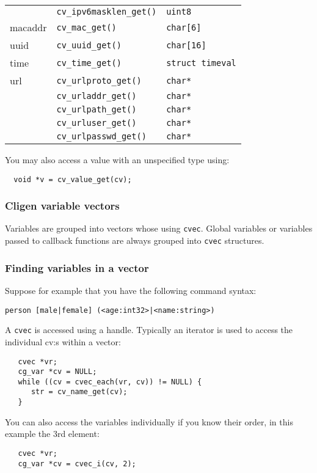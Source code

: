 \documentclass[a4paper, 10pt] {article}
\begin{document}
\begin{tabular}{ | l | l | l | }
           & {\tt cv\_ipv6masklen\_get()} & {\tt uint8}\\
macaddr    & {\tt cv\_mac\_get()} & {\tt char[6]}\\
uuid       & {\tt cv\_uuid\_get()} & {\tt char[16]}\\
time       & {\tt cv\_time\_get()} & {\tt struct timeval}\\
url        & {\tt cv\_urlproto\_get()} & {\tt char*}\\
           & {\tt cv\_urladdr\_get()} & {\tt char*}\\
           & {\tt cv\_urlpath\_get()} & {\tt char*}\\
           & {\tt cv\_urluser\_get()} & {\tt char*}\\
           & {\tt cv\_urlpasswd\_get()} & {\tt char*}\\
\hline
\end{tabular}

You may also access a value with an unspecified type using:
\begin{verbatim}
  void *v = cv_value_get(cv);
\end{verbatim}


\subsubsection{Cligen variable vectors}
Variables are grouped into vectors whose using {\tt cvec}. Global variables or variables
passed to callback functions are always grouped into {\tt cvec}
structures.

\subsubsection{Finding variables in a vector}
\label{sec:find}

Suppose for example that you have the following command syntax:
\begin{verbatim}
person [male|female] (<age:int32>|<name:string>)
\end{verbatim}

A {\tt cvec} is accessed using a handle. Typically an iterator is used to access the individual cv:s within a vector:
\begin{verbatim}
   cvec *vr;
   cg_var *cv = NULL;
   while ((cv = cvec_each(vr, cv)) != NULL) {
      str = cv_name_get(cv);
   }
\end{verbatim}

You can also access the variables individually if you know their order, in this example the 3rd element:
\begin{verbatim}
   cvec *vr;
   cg_var *cv = cvec_i(cv, 2);
\end{verbatim}
\end{document}
